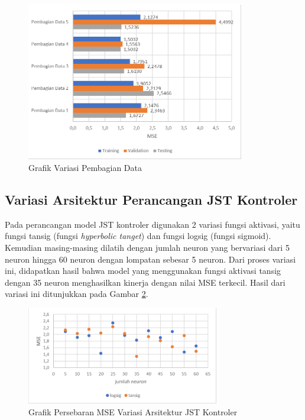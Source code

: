 \begin{figure}[!h]
	\centering
	\includegraphics[width=0.85\textwidth]{figures/VariasiPembagianDataJSTKontroler}
	\caption{Grafik Variasi Pembagian Data}
	\label{fig:5:DataSplittingVariation}
\end{figure}

\subsection{Variasi Arsitektur Perancangan JST Kontroler}

Pada perancangan model JST kontroler digunakan 2 variasi fungsi aktivasi, yaitu fungsi tansig (fungsi \textit{hyperbolic tanget}) dan fungsi logsig (fungsi sigmoid). Kemudian masing-masing dilatih dengan jumlah neuron yang bervariasi dari 5 neuron hingga 60 neuron dengan lompatan sebesar 5 neuron. Dari proses variasi ini, didapatkan hasil bahwa model yang menggunakan fungsi aktivasi tansig dengan 35 neuron menghasilkan kinerja dengan nilai MSE terkecil. Hasil dari variasi ini ditunjukkan pada Gambar \ref{fig:5:ActivationVariation}.

\begin{figure}[!h]
	\centering
	\includegraphics[width=0.75\textwidth]{figures/ActivationVariation}
	\caption{Grafik Persebaran MSE Variasi Arsitektur JST Kontroler}
	\label{fig:5:ActivationVariation}
\end{figure}

